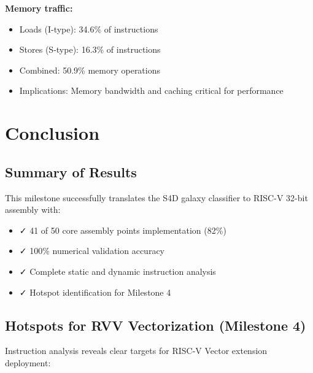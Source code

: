 \documentclass[conference]{IEEEtran}
\begin{document}
\textbf{Memory traffic:}
\begin{itemize}
    \item Loads (I-type): 34.6\% of instructions
    \item Stores (S-type): 16.3\% of instructions
    \item Combined: 50.9\% memory operations
    \item Implications: Memory bandwidth and caching critical for performance
\end{itemize}

\section{Conclusion}

\subsection{Summary of Results}

This milestone successfully translates the S4D galaxy classifier to RISC-V 32-bit assembly with:
\begin{itemize}
    \item ✓ 41 of 50 core assembly points implementation (82\%)
    \item ✓ 100\% numerical validation accuracy
    \item ✓ Complete static and dynamic instruction analysis
    \item ✓ Hotspot identification for Milestone 4
\end{itemize}

\subsection{Hotspots for RVV Vectorization (Milestone 4)}

Instruction analysis reveals clear targets for RISC-V Vector extension deployment:
\end{document}
